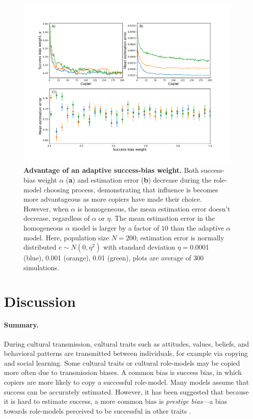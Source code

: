 \documentclass[12pt]{extarticle}
\begin{document}
\begin{figure}[H]
    \includegraphics[width=\linewidth]{../figures/final/choose_bias.pdf}
  \caption{
  \textbf{Advantage of an adaptive success-bias weight.}
  Both success-bias weight $\alpha$ (\textbf{a}) and estimation error (\textbf{b}) decrease during the role-model choosing process, demonstrating that influence is becomes more advantageous as more copiers have made their choice.
However, when $\alpha$ is homogeneous, the mean estimation error doesn't decrease, regardless of $\alpha$ or $\eta$.
The mean estimation error in the homogeneous $\alpha$ model is larger by a factor of $10$ than the adaptive $\alpha$ model.
Here, population size $N=200$; estimation error is normally distributed $e \sim N(0,\eta^2)$ with standard deviation $\eta=$0.0001 (blue), 0.001 (orange), 0.01 (green), plots are average of $300$ simulations.}	
  \label{fig:influence_advantage}
\end{figure}



\clearpage
\section*{Discussion}
\paragraph{Summary.}
During cultural transmission, cultural traits such as attitudes, values, beliefs, and behavioral patterns are transmitted between individuals, for example via copying and social learning.
Some cultural traits or cultural role-models may be copied more often due to transmission biases. 
A common bias is success bias, in which copiers are more likely to copy a successful role-model. Many models assume that success can be accurately estimated.
However, it has been suggested that because it is hard to estimate success, a more common bias is \textit{prestige bias}---a bias towards role-models perceived to be successful in other traits \citep{complexityPaper}. %
\end{document}
